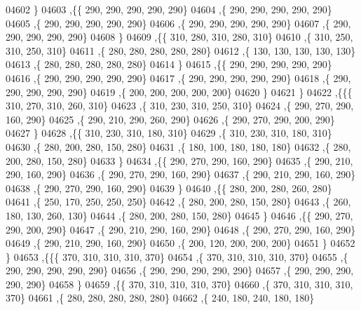 \begin{DoxyCode}
04602     \}
04603    ,\{\{   290,   290,   290,   290,   290\}
04604     ,\{   290,   290,   290,   290,   290\}
04605     ,\{   290,   290,   290,   290,   290\}
04606     ,\{   290,   290,   290,   290,   290\}
04607     ,\{   290,   290,   290,   290,   290\}
04608     \}
04609    ,\{\{   310,   280,   310,   280,   310\}
04610     ,\{   310,   250,   310,   250,   310\}
04611     ,\{   280,   280,   280,   280,   280\}
04612     ,\{   130,   130,   130,   130,   130\}
04613     ,\{   280,   280,   280,   280,   280\}
04614     \}
04615    ,\{\{   290,   290,   290,   290,   290\}
04616     ,\{   290,   290,   290,   290,   290\}
04617     ,\{   290,   290,   290,   290,   290\}
04618     ,\{   290,   290,   290,   290,   290\}
04619     ,\{   200,   200,   200,   200,   200\}
04620     \}
04621    \}
04622   ,\{\{\{   310,   270,   310,   260,   310\}
04623     ,\{   310,   230,   310,   250,   310\}
04624     ,\{   290,   270,   290,   160,   290\}
04625     ,\{   290,   210,   290,   260,   290\}
04626     ,\{   290,   270,   290,   200,   290\}
04627     \}
04628    ,\{\{   310,   230,   310,   180,   310\}
04629     ,\{   310,   230,   310,   180,   310\}
04630     ,\{   280,   200,   280,   150,   280\}
04631     ,\{   180,   100,   180,   180,   180\}
04632     ,\{   280,   200,   280,   150,   280\}
04633     \}
04634    ,\{\{   290,   270,   290,   160,   290\}
04635     ,\{   290,   210,   290,   160,   290\}
04636     ,\{   290,   270,   290,   160,   290\}
04637     ,\{   290,   210,   290,   160,   290\}
04638     ,\{   290,   270,   290,   160,   290\}
04639     \}
04640    ,\{\{   280,   200,   280,   260,   280\}
04641     ,\{   250,   170,   250,   250,   250\}
04642     ,\{   280,   200,   280,   150,   280\}
04643     ,\{   260,   180,   130,   260,   130\}
04644     ,\{   280,   200,   280,   150,   280\}
04645     \}
04646    ,\{\{   290,   270,   290,   200,   290\}
04647     ,\{   290,   210,   290,   160,   290\}
04648     ,\{   290,   270,   290,   160,   290\}
04649     ,\{   290,   210,   290,   160,   290\}
04650     ,\{   200,   120,   200,   200,   200\}
04651     \}
04652    \}
04653   ,\{\{\{   370,   310,   310,   310,   370\}
04654     ,\{   370,   310,   310,   310,   370\}
04655     ,\{   290,   290,   290,   290,   290\}
04656     ,\{   290,   290,   290,   290,   290\}
04657     ,\{   290,   290,   290,   290,   290\}
04658     \}
04659    ,\{\{   370,   310,   310,   310,   370\}
04660     ,\{   370,   310,   310,   310,   370\}
04661     ,\{   280,   280,   280,   280,   280\}
04662     ,\{   240,   180,   240,   180,   180\}

\end{DoxyCode}
